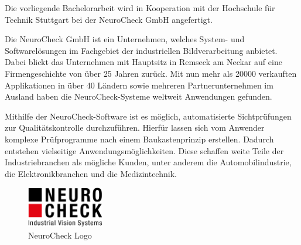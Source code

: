Die vorliegende Bachelorarbeit wird in Kooperation mit der Hochschule für Technik Stuttgart bei der NeuroCheck GmbH angefertigt.

\p
Die NeuroCheck GmbH ist ein Unternehmen, welches System- und Softwarelösungen im Fachgebiet der industriellen Bildverarbeitung anbietet.
Dabei blickt das Unternehmen mit Hauptsitz in Remseck am Neckar auf eine Firmengeschichte von über 25 Jahren zurück.
Mit nun mehr als 20000 verkauften Applikationen in über 40 Ländern sowie mehreren Partnerunternehmen im Ausland haben die NeuroCheck-Systeme weltweit Anwendungen gefunden.

\p
Mithilfe der NeuroCheck-Software ist es möglich, automatisierte Sichtprüfungen zur Qualitätskontrolle durchzuführen.
Hierfür lassen sich vom Anwender komplexe Prüfprogramme nach einem Baukastenprinzip erstellen.
Dadurch entstehen vielseitige An\-wen\-dungs\-mög\-lich\-kei\-ten.
Diese schaffen weite Teile der Industriebranchen als mögliche Kunden, unter anderem die Automobilindustrie, die Elektronikbranchen und die Medizintechnik.

\begin{figure}[H]
	\centering
	\includegraphics[width=0.3\textwidth]{01_einfuehrung/unternehmensvorstellung/figures/neurocheck_logo}
	\caption[NeuroCheck Logo]{NeuroCheck Logo \cite{nclogo}}
\end{figure}